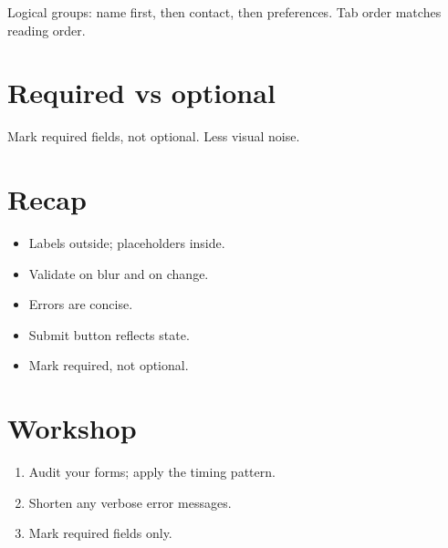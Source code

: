 Logical groups: name first, then contact, then preferences.
Tab order matches reading order.

\section{Required vs optional}

Mark required fields, not optional. Less visual noise.

\section{Recap}

\begin{recap}
\begin{itemize}[leftmargin=*]
  \item Labels outside; placeholders inside.
  \item Validate on blur and on change.
  \item Errors are concise.
  \item Submit button reflects state.
  \item Mark required, not optional.
\end{itemize}
\end{recap}

\section*{Workshop}

\begin{enumerate}[leftmargin=*]
  \item Audit your forms; apply the timing pattern.
  \item Shorten any verbose error messages.
  \item Mark required fields only.
\end{enumerate}
